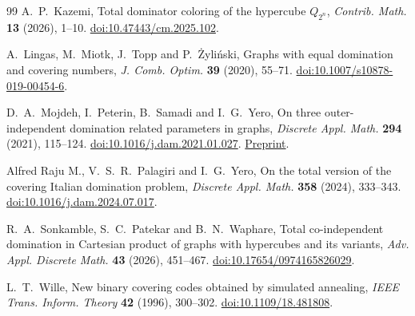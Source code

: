 \documentclass[11pt,a4paper]{article}
\begin{document}
\begin{thebibliography}{99}
A.~P.~Kazemi, Total dominator coloring of the hypercube $Q_{2^n}$,
\emph{Contrib. Math.} \textbf{13} (2026), 1--10.
\href{https://doi.org/10.47443/cm.2025.102}{doi:10.47443/cm.2025.102}.

A.~Lingas, M.~Miotk, J.~Topp and P.~\.{Z}yli\'nski,
Graphs with equal domination and covering numbers,
\emph{J. Comb. Optim.} \textbf{39} (2020), 55--71.
\href{https://doi.org/10.1007/s10878-019-00454-6}{doi:10.1007/s10878-019-00454-6}.

D.~A.~Mojdeh, I.~Peterin, B.~Samadi and I.~G.~Yero,
On three outer-independent domination related parameters in graphs,
\emph{Discrete Appl. Math.} \textbf{294} (2021), 115--124.
\href{https://doi.org/10.1016/j.dam.2021.01.027}{doi:10.1016/j.dam.2021.01.027}.
\href{https://arxiv.org/abs/1812.10946}{Preprint}.

Alfred Raju M., V.~S.~R.~Palagiri and I.~G.~Yero,
On the total version of the covering Italian domination problem,
\emph{Discrete Appl. Math.} \textbf{358} (2024), 333--343.
\href{https://doi.org/10.1016/j.dam.2024.07.017}{doi:10.1016/j.dam.2024.07.017}.

R.~A.~Sonkamble, S.~C.~Patekar and B.~N.~Waphare,
Total co-independent domination in Cartesian product of graphs with
hypercubes and its variants, \emph{Adv. Appl. Discrete Math.}
\textbf{43} (2026), 451--467.
\href{https://doi.org/10.17654/0974165826029}{doi:10.17654/0974165826029}.

L.~T.~Wille, New binary covering codes obtained by simulated annealing,
\emph{IEEE Trans. Inform. Theory} \textbf{42} (1996), 300--302.
\href{https://doi.org/10.1109/18.481808}{doi:10.1109/18.481808}.

\end{thebibliography}
\end{document}
